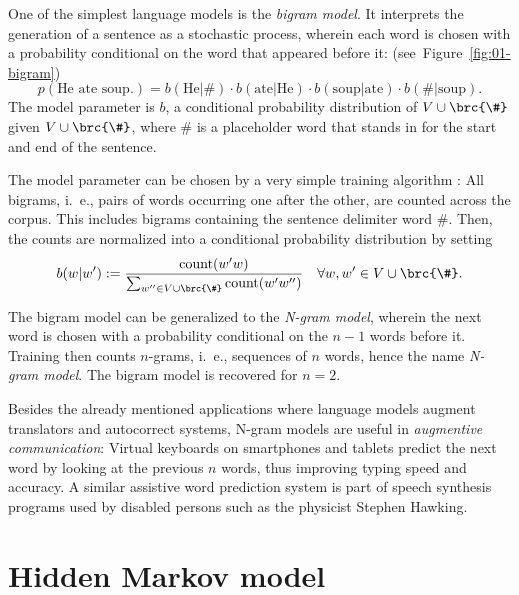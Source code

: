 One of the simplest language models is the \emph{bigram model}.
\cite{jm09} It interprets the generation of a sentence as a stochastic
process, wherein each word is chosen with a probability conditional on the word
that appeared before it: (see~Figure~\ref{fig:01-bigram})
\[
 p(\text{He ate soup.}) = b(\text{He}|\#) \cdot b(\text{ate}|\text{He}) \cdot b(\text{soup}|\text{ate}) \cdot b(\#|\text{soup}).
\]
The model parameter is $b$, a conditional probability distribution of
$V\cup\brc{\#}$ given $V\cup\brc{\#}$, where $\#$ is a placeholder word
that stands in for the start and end of the sentence.

The model parameter can be chosen by a very simple training algorithm
\cite[pp.~123]{jm09}: All bigrams, i.~e., pairs of words occurring one after the
other, are counted across the corpus. This includes bigrams containing the
sentence delimiter word $\#$. Then, the counts are normalized into a
conditional probability distribution by setting
\[
 b(w|w') := \frac{\operatorname{count}(w'w)}{\sum_{w''\in V\cup\brc{\#}} \operatorname{count}(w'w'')}
 \quad\forall w,w'\in V\cup\brc{\#}.
\]

The bigram model can be generalized to the \emph{N-gram model}, wherein the
next word is chosen with a probability conditional on the $n-1$ words before
it. Training then counts $n$-grams, i.~e., sequences of $n$ words, hence the
name \emph{N-gram model}. The bigram model is recovered for $n=2$.

Besides the already mentioned applications where language models augment
translators and autocorrect systems, N-gram models are useful in
\emph{augmentive communication}: Virtual keyboards on smartphones and tablets
predict the next word by looking at the previous $n$ words, thus improving
typing speed and accuracy.  \cite{hasan2004n} A similar assistive word
prediction system is part of speech synthesis programs used by disabled persons
such as the physicist Stephen Hawking. \cite{newelletal1998}

\section{Hidden Markov model}

